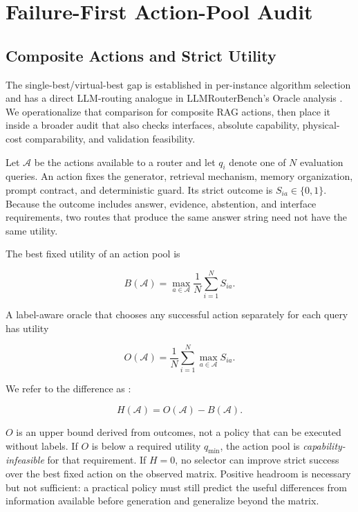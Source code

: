 \section{Failure-First Action-Pool Audit}
\label{sec:audit}

\subsection{Composite Actions and Strict Utility}

The single-best/virtual-best gap is established in per-instance algorithm
selection \cite{Rice1976AlgorithmSelection,LindauerEtAl2019AlgorithmSelection}
and has a direct LLM-routing analogue in LLMRouterBench's Oracle analysis
\cite{LiEtAl2026LLMRouterBench}. We operationalize that comparison for composite
RAG actions, then place it inside a broader audit that also checks interfaces,
absolute capability, physical-cost comparability, and validation feasibility.

Let $\mathcal{A}$ be the actions available to a router and let $q_i$ denote one of
$N$ evaluation queries. An action fixes the generator, retrieval mechanism, memory
organization, prompt contract, and deterministic guard. Its strict outcome is
$S_{ia}\in\{0,1\}$. Because the outcome includes answer, evidence, abstention, and
interface requirements, two routes that produce the same answer string need not
have the same utility.

The best fixed utility of an action pool is

\begin{equation}
B(\mathcal{A})=\max_{a\in\mathcal{A}}
\frac{1}{N}\sum_{i=1}^{N}S_{ia}.
\label{eq:best-fixed}
\end{equation}

A label-aware oracle that chooses any successful action separately for each query
has utility

\begin{equation}
O(\mathcal{A})=\frac{1}{N}\sum_{i=1}^{N}
\max_{a\in\mathcal{A}}S_{ia}.
\label{eq:oracle}
\end{equation}

We refer to the difference as \routingheadroom{}:

\begin{equation}
H(\mathcal{A})=O(\mathcal{A})-B(\mathcal{A}).
\label{eq:headroom}
\end{equation}

$O$ is an upper bound derived from outcomes, not a policy that can be executed
without labels. If $O$ is below a required utility $q_{\min}$, the action pool is
\emph{capability-infeasible} for that requirement. If $H=0$, no selector can improve
strict success over the best fixed action on the observed matrix. Positive headroom
is necessary but not sufficient: a practical policy must still predict the useful
differences from information available before generation and generalize beyond the
matrix.


